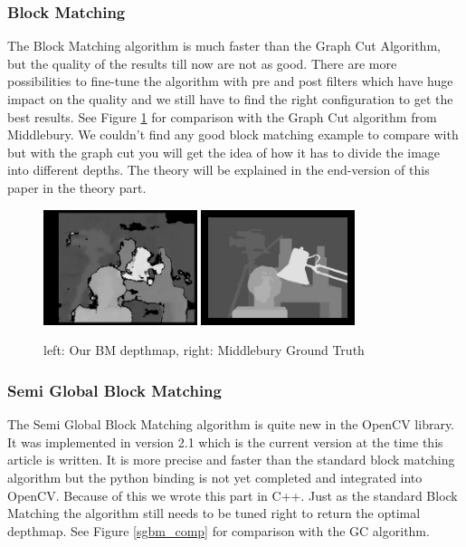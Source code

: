 \documentclass[a4paper]{article}
\begin{document}
\subsubsection{Block Matching}
The Block Matching algorithm is much faster than the Graph Cut
Algorithm, but the quality of the results till now are not as good.
There are more possibilities to fine-tune the algorithm with pre and
post filters which have huge impact on the quality and we still have
to find the right configuration to get the best results. See Figure
\ref{bm_comp} for comparison with the Graph Cut algorithm from
Middlebury. We couldn't find any good block matching example to
compare with but with the graph cut you will get the idea of how it
has to divide the image into different depths. The theory will be
explained in the end-version of this paper in the theory
part. %

\begin{figure} [h!tb]
  \centering
  \includegraphics[width=0.4\textwidth]{bm_tsukuba_own}
  \includegraphics[width=0.4\textwidth]{disp_tsukuba_orig}
  \caption{left: Our BM depthmap, right: Middlebury Ground Truth}
  \label{bm_comp}
\end{figure}

\subsubsection{Semi Global Block Matching}
The Semi Global Block Matching algorithm is quite new in the OpenCV
library. It was implemented in version 2.1 which is the current
version at the time this article is written. It is more precise and
faster than the standard block matching algorithm but the python
binding is not yet completed and integrated into OpenCV. Because of
this we wrote this part in C++. Just as the standard Block Matching
the algorithm still needs to be tuned right to return the optimal
depthmap. See Figure \ref{sgbm_comp} for comparison with the GC
algorithm.
\end{document}
